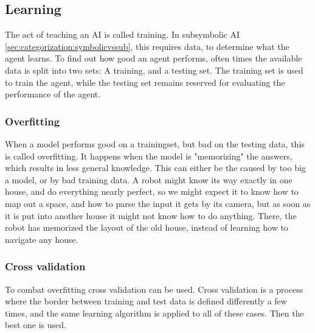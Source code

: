 \subsection{Learning}
The act of teaching an AI is called training. In subsymbolic AI \ref{sec:categorization:symbolicvssub}, this requires data, to determine what the agent learns. To find out how good an agent performs, often times the available data is split into two sets: A training, and a testing set. The training set is used to train the agent, while the testing set remains reserved for evaluating the performance of the agent.

\subsubsection{Overfitting}
\label{sec:overfit}
When a model performs good on a trainingset, but bad on the testing data, this is called overfitting. It happens when the model is "memorizing" the answers, which results in less general knowledge. This can either be the caused by too big a model, or by bad training data\cite{overfit}. A robot might know its way exactly in one house, and do everything nearly perfect, so we might expect it to know how to map out a space, and how to parse the input it gets by its camera, but as soon as it is put into another house it might not know how to do anything. There, the robot has memorized the layout of the old house, instead of learning how to navigate any house.

\subsubsection{Cross validation}
To combat overfitting cross validation can be used. Cross validation is a process where the border between training and test data is defined differently a few times, and the same learning algorithm is applied to all of these cases. Then the best one is used.